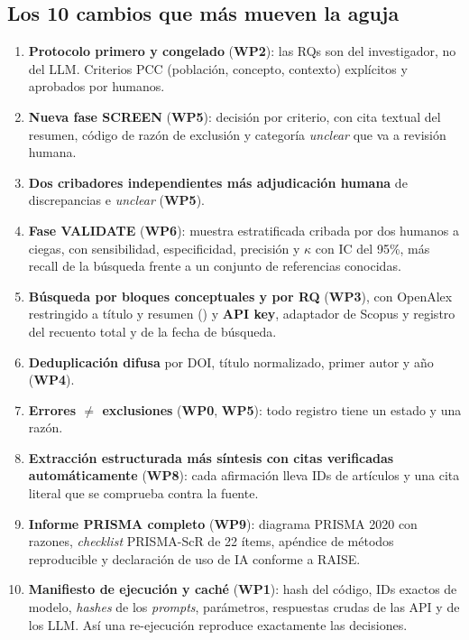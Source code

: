 \documentclass[11pt,a4paper]{article}
\newcommand{\WP}[1]{\textbf{\textcolor{palet}{WP#1}}}
\begin{document}
\subsection*{Los 10 cambios que más mueven la aguja}

\begin{enumerate}
  \item \textbf{Protocolo primero y congelado} (\WP{2}): las RQs son del investigador, no del LLM. Criterios PCC (población, concepto, contexto) explícitos y aprobados por humanos.
  \item \textbf{Nueva fase SCREEN} (\WP{5}): decisión por criterio, con cita textual del resumen, código de razón de exclusión y categoría \emph{unclear} que va a revisión humana.
  \item \textbf{Dos cribadores independientes más adjudicación humana} de discrepancias e \emph{unclear} (\WP{5}).
  \item \textbf{Fase VALIDATE} (\WP{6}): muestra estratificada cribada por dos humanos a ciegas, con sensibilidad, especificidad, precisión y $\kappa$ con IC del 95\%, más recall de la búsqueda frente a un conjunto de referencias conocidas.
  \item \textbf{Búsqueda por bloques conceptuales y por RQ} (\WP{3}), con OpenAlex restringido a título y resumen () y \textbf{API key}, adaptador de Scopus y registro del recuento total y de la fecha de búsqueda.
  \item \textbf{Deduplicación difusa} por DOI, título normalizado, primer autor y año (\WP{4}).
  \item \textbf{Errores $\neq$ exclusiones} (\WP{0}, \WP{5}): todo registro tiene un estado y una razón.
  \item \textbf{Extracción estructurada más síntesis con citas verificadas automáticamente} (\WP{8}): cada afirmación lleva IDs de artículos y una cita literal que se comprueba contra la fuente.
  \item \textbf{Informe PRISMA completo} (\WP{9}): diagrama PRISMA 2020 con razones, \emph{checklist} PRISMA-ScR de 22 ítems, apéndice de métodos reproducible y declaración de uso de IA conforme a RAISE.
  \item \textbf{Manifiesto de ejecución y caché} (\WP{1}): hash del código, IDs exactos de modelo, \emph{hashes} de los \emph{prompts}, parámetros, respuestas crudas de las API y de los LLM. Así una re-ejecución reproduce exactamente las decisiones.
\end{enumerate}
\end{document}

